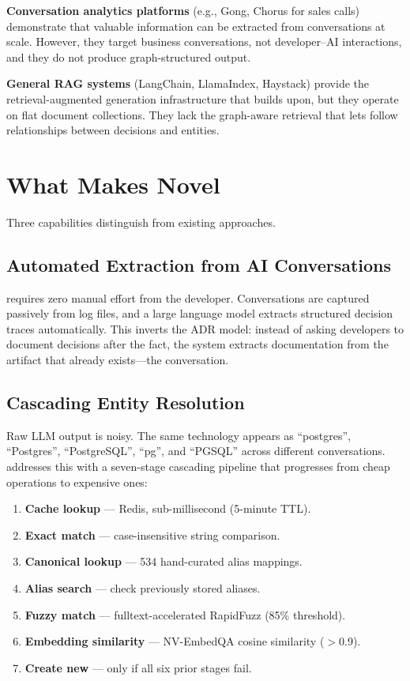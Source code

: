 \textbf{Conversation analytics platforms} (e.g., Gong, Chorus for sales calls)
demonstrate that valuable information can be extracted from conversations at
scale.  However, they target business conversations, not developer--AI
interactions, and they do not produce graph-structured output.

\textbf{General RAG systems} (LangChain, LlamaIndex, Haystack) provide the
retrieval-augmented generation infrastructure that \sysname{} builds upon, but
they operate on flat document collections.  They lack the graph-aware retrieval
that lets \sysname{} follow relationships between decisions and entities.


\section{What Makes \sysname{} Novel}
\label{sec:novelty}

Three capabilities distinguish \sysname{} from existing approaches.

\subsection{Automated Extraction from AI Conversations}

\sysname{} requires zero manual effort from the developer.  Conversations are
captured passively from log files, and a large language model extracts
structured decision traces automatically.  This inverts the ADR model: instead
of asking developers to document decisions after the fact, the system extracts
documentation from the artifact that already exists---the conversation.

\subsection{Cascading Entity Resolution}

Raw LLM output is noisy.  The same technology appears as ``postgres'',
``Postgres'', ``PostgreSQL'', ``pg'', and ``PGSQL'' across different
conversations.  \sysname{} addresses this with a seven-stage cascading
pipeline that progresses from cheap operations to expensive ones:

\begin{enumerate}
    \item \textbf{Cache lookup} --- Redis, sub-millisecond (5-minute TTL).
    \item \textbf{Exact match} --- case-insensitive string comparison.
    \item \textbf{Canonical lookup} --- 534 hand-curated alias mappings.
    \item \textbf{Alias search} --- check previously stored aliases.
    \item \textbf{Fuzzy match} --- fulltext-accelerated RapidFuzz (85\% threshold).
    \item \textbf{Embedding similarity} --- NV-EmbedQA cosine similarity ($>$0.9).
    \item \textbf{Create new} --- only if all six prior stages fail.
\end{enumerate}

